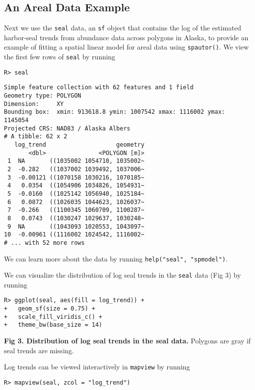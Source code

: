 \documentclass[10pt,letterpaper]{article}
\begin{document}
\hypertarget{an-areal-data-example}{%
\subsection{An Areal Data Example}\label{an-areal-data-example}}

Next we use the \texttt{seal} data, an \texttt{sf} object that contains
the log of the estimated harbor-seal trends from abundance data across
polygons in Alaska, to provide an example of fitting a spatial linear
model for areal data using \texttt{spautor()}. We view the first few
rows of \texttt{seal} by running

\begin{verbatim}
R> seal
\end{verbatim}

\begin{verbatim}
Simple feature collection with 62 features and 1 field
Geometry type: POLYGON
Dimension:     XY
Bounding box:  xmin: 913618.8 ymin: 1007542 xmax: 1116002 ymax: 1145054
Projected CRS: NAD83 / Alaska Albers
# A tibble: 62 x 2
   log_trend                    geometry
       <dbl>               <POLYGON [m]>
 1  NA       ((1035002 1054710, 1035002~
 2  -0.282   ((1037002 1039492, 1037006~
 3  -0.00121 ((1070158 1030216, 1070185~
 4   0.0354  ((1054906 1034826, 1054931~
 5  -0.0160  ((1025142 1056940, 1025184~
 6   0.0872  ((1026035 1044623, 1026037~
 7  -0.266   ((1100345 1060709, 1100287~
 8   0.0743  ((1030247 1029637, 1030248~
 9  NA       ((1043093 1020553, 1043097~
10  -0.00961 ((1116002 1024542, 1116002~
# ... with 52 more rows
\end{verbatim}

\noindent We can learn more about the data by running
\texttt{help("seal",\ "spmodel")}.

We can visualize the distribution of log seal trends in the
\texttt{seal} data (Fig 3) by running

\begin{verbatim}
R> ggplot(seal, aes(fill = log_trend)) +
+   geom_sf(size = 0.75) +
+   scale_fill_viridis_c() +
+   theme_bw(base_size = 14)
\end{verbatim}

\textbf{Fig 3. Distribution of log seal trends in the seal data.}
Polygons are gray if seal trends are missing.

\noindent Log trends can be viewed interactively in \texttt{mapview} by
running

\begin{verbatim}
R> mapview(seal, zcol = "log_trend")
\end{verbatim}
\end{document}
